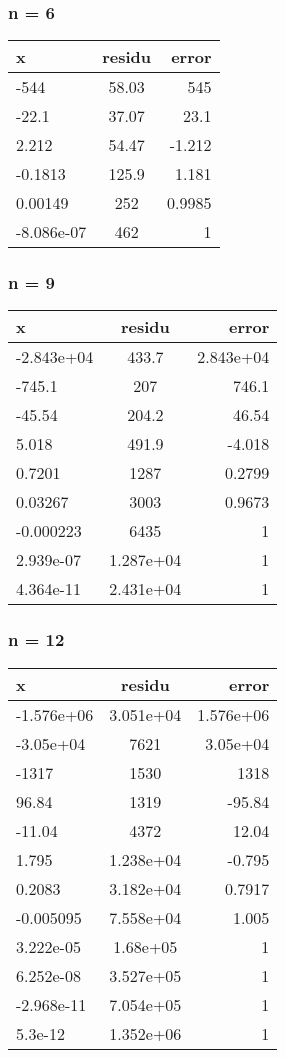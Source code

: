 \documentclass[10pt,a4paper,twocolumn]{article}
\begin{document}
\subsubsection{n = 6}
 \begin{tabular}{ l | c | r }
   \textbf{x} & \textbf{residu} & \textbf{error} \\ \hline
   -544 & 58.03 & 545 \\
   -22.1 & 37.07 & 23.1 \\
   2.212 & 54.47 & -1.212 \\
   -0.1813 & 125.9 & 1.181 \\
   0.00149 & 252 & 0.9985 \\
   -8.086e-07 & 462 & 1\\
\end{tabular}
\subsubsection{n = 9}
 \begin{tabular}{ l | c | r }
   \textbf{x} & \textbf{residu} & \textbf{error} \\ \hline
   -2.843e+04  & 433.7 & 2.843e+04\\
   -745.1 & 207 & 746.1\\
   -45.54 & 204.2 & 46.54\\
   5.018 & 491.9 & -4.018\\
   0.7201 & 1287 & 0.2799\\
   0.03267 & 3003 & 0.9673\\
   -0.000223 & 6435 & 1\\
   2.939e-07 & 1.287e+04 & 1\\
   4.364e-11 & 2.431e+04 & 1\\
\end{tabular}
\subsubsection{n = 12}
 \begin{tabular}{ l | c | r }
   \textbf{x} & \textbf{residu} & \textbf{error} \\ \hline
-1.576e+06 &  3.051e+04 & 1.576e+06\\
-3.05e+04 & 7621 & 3.05e+04\\
-1317 & 1530 & 1318 \\
96.84 & 1319 & -95.84 \\
-11.04 & 4372 & 12.04\\
1.795 & 1.238e+04 & -0.795 \\
0.2083 & 3.182e+04 & 0.7917 \\
-0.005095 & 7.558e+04 & 1.005 \\
3.222e-05 & 1.68e+05 & 1 \\
6.252e-08 & 3.527e+05 & 1 \\
-2.968e-11 & 7.054e+05 & 1 \\
5.3e-12 & 1.352e+06 & 1 \\
\end{tabular}
\end{document}

